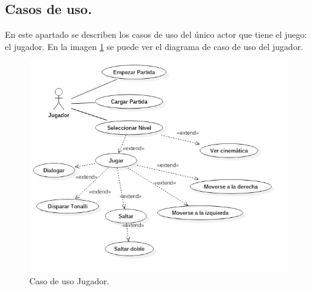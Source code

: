 \subsection{Casos de uso.}
En este apartado se describen los casos de uso del único actor que tiene el juego: el jugador. En la imagen \ref{fig:casosUso} se puede ver el diagrama de caso de uso del jugador.

\begin{figure}
	\centering
	\includegraphics[width=\textwidth]{05TrabajoRealizado/01DocDiseno/imagenes/casoUso1.jpg}
	\caption{Caso de uso Jugador.}
	\label{fig:casosUso}
\end{figure}

















 



